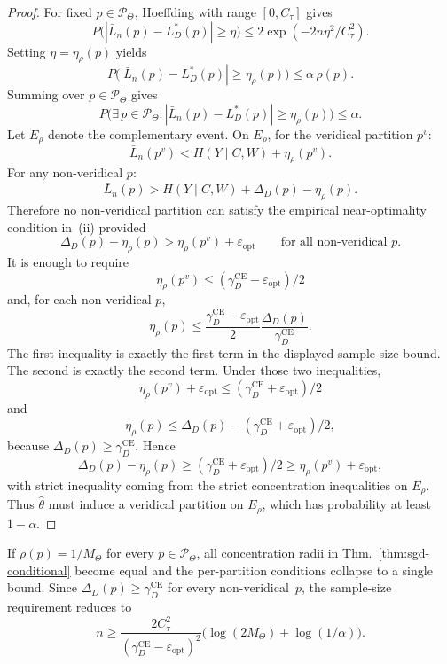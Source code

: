 \documentclass[twoside,11pt]{article}
\newcommand{\CE}{\mathrm{CE}}
\newcommand{\thmref}[1]{Thm.~\ref{#1}}
\begin{document}
\begin{proof}
For fixed $p \in \mathcal{P}_\Theta$, Hoeffding with range $[0,C_\tau]$ gives
\[
P\bigl(|\bar L_n(p)-L_D^*(p)|\ge\eta\bigr) \le 2\exp(-2n\eta^2/C_\tau^2).
\]
Setting $\eta=\eta_\rho(p)$ yields
\[
P\bigl(|\bar L_n(p)-L_D^*(p)|\ge\eta_\rho(p)\bigr)
\le \alpha\,\rho(p).
\]
Summing over $p \in \mathcal{P}_\Theta$ gives
\[
P\bigl(\exists\, p \in \mathcal{P}_\Theta:
|\bar L_n(p)-L_D^*(p)|\ge\eta_\rho(p)\bigr)
\le \alpha.
\]
Let $E_\rho$ denote the complementary event. On $E_\rho$, for the veridical partition $p^v$:
\[
\bar L_n(p^v) < H(Y \mid C,W) + \eta_\rho(p^v).
\]
For any non-veridical $p$:
\[
\bar L_n(p) > H(Y \mid C,W) + \Delta_D(p) - \eta_\rho(p).
\]
Therefore no non-veridical partition can satisfy the empirical near-optimality condition in~(ii) provided
\[
\Delta_D(p) - \eta_\rho(p) > \eta_\rho(p^v) + \varepsilon_{\mathrm{opt}}
\qquad
\text{for all non-veridical } p.
\]
It is enough to require
\[
\eta_\rho(p^v) \le (\gamma_D^{\CE}-\varepsilon_{\mathrm{opt}})/2
\]
and, for each non-veridical $p$,
\[
\eta_\rho(p)
\le \frac{\gamma_D^{\CE}-\varepsilon_{\mathrm{opt}}}{2}
\frac{\Delta_D(p)}{\gamma_D^{\CE}}.
\]
The first inequality is exactly the first term in the displayed sample-size bound. The second is exactly the second term. Under those two inequalities,
\[
\eta_\rho(p^v) + \varepsilon_{\mathrm{opt}}
\le (\gamma_D^{\CE}+\varepsilon_{\mathrm{opt}})/2
\]
and
\[
\eta_\rho(p)
\le \Delta_D(p) - (\gamma_D^{\CE}+\varepsilon_{\mathrm{opt}})/2,
\]
because $\Delta_D(p)\ge \gamma_D^{\CE}$. Hence
\[
\Delta_D(p) - \eta_\rho(p)
\ge (\gamma_D^{\CE}+\varepsilon_{\mathrm{opt}})/2
\ge \eta_\rho(p^v)+\varepsilon_{\mathrm{opt}},
\]
with strict inequality coming from the strict concentration inequalities on $E_\rho$. Thus $\hat\theta$ must induce a veridical partition on $E_\rho$, which has probability at least $1-\alpha$.
\end{proof}

\begin{corollary}\label{cor:sgd-uniform}
If $\rho(p)=1/M_\Theta$ for every $p \in \mathcal{P}_\Theta$, all concentration radii in \thmref{thm:sgd-conditional} become equal and the per-partition conditions collapse to a single bound. Since $\Delta_D(p)\ge \gamma_D^{\CE}$ for every non-veridical~$p$, the sample-size requirement reduces to
\[
n \ge \frac{2C_\tau^2}{(\gamma_D^{\CE}-\varepsilon_{\mathrm{opt}})^2}
    \bigl(\log(2M_\Theta)+\log(1/\alpha)\bigr).
\]
\end{corollary}
\end{document}
